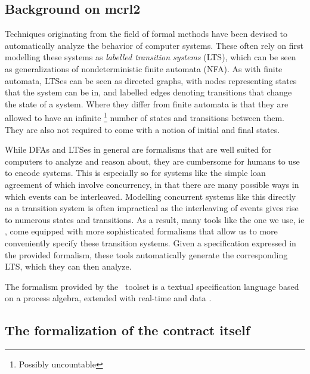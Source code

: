 \documentclass{article}
\begin{document}

\subsection{Background on mcrl2}
Techniques originating from the field of formal methods have been devised to
automatically analyze the behavior of computer systems.
These often rely on first modelling these systems as
\textit{labelled transition systems} (LTS), which can be seen as
generalizations of nondeterministic finite automata (NFA).
As with finite automata, LTSes can be seen as directed graphs, with nodes
representing states that the system can be in, and labelled edges denoting
transitions that change the state of a system.
Where they differ from finite automata is that they are allowed to have an
infinite \footnote{Possibly uncountable} number of states and transitions
between them.
They are also not required to come with a notion of initial and final states.

While DFAs and LTSes in general are formalisms that are well suited for
computers to analyze and reason about, they are cumbersome for humans to use
to encode systems.
This is especially so for systems like the simple loan agreement of
\cite{contract_as_automaton} which involve concurrency, in that there are
many possible ways in which events can be interleaved.
Modelling concurrent systems like this directly as a transition system is
often impractical as the interleaving of events gives rise to numerous states
and transitions.
As a result, many tools like the one we use, ie \mcrl, come equipped with
more sophisticated formalisms that allow us to more conveniently specify these
transition systems.
Given a specification expressed in the provided formalism, these tools
automatically generate the corresponding LTS, which they can then analyze.

The formalism provided by the \mcrl \, toolset is a textual specification
language based on a process algebra, extended with real-time and data
\cite{mcrl_book}.


\subsection{The formalization of the contract itself}
\end{document}
